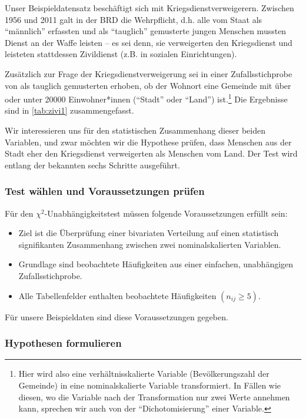 \documentclass[
  ngerman,
]{article}
\providecommand{\tightlist}{%
  \setlength{\itemsep}{0pt}\setlength{\parskip}{0pt}}
\begin{document}
Unser Beispieldatensatz beschäftigt sich mit Kriegsdienstverweigerern. Zwischen 1956 und 2011 galt in der BRD die Wehrpflicht, d.h. alle vom Staat als ``männlich'' erfassten und als ``tauglich'' gemusterte jungen Menschen mussten Dienst an der Waffe leisten -- es sei denn, sie verweigerten den Kriegsdienst und leisteten stattdessen Zivildienst (z.B. in sozialen Einrichtungen).

Zusätzlich zur Frage der Kriegsdienstverweigerung sei in einer Zufallsstichprobe von als tauglich gemusterten erhoben, ob der Wohnort eine Gemeinde mit über oder unter 20000 Einwohner*innen (``Stadt'' oder ``Land'') ist.\footnote{Hier wird also eine verhältnisskalierte Variable (Bevölkerungszahl der Gemeinde) in eine nominalskalierte Variable transformiert. In Fällen wie diesen, wo die Variable nach der Transformation nur zwei Werte annehmen kann, sprechen wir auch von der ``Dichotomisierung'' einer Variable.} Die Ergebnisse sind in \autoref{tab:zivi1} zusammengefasst.

Wir interessieren uns für den statistischen Zusammenhang dieser beiden Variablen, und zwar möchten wir die Hypothese prüfen, dass Menschen aus der Stadt eher den Kriegsdienst verweigerten als Menschen vom Land. Der Test wird entlang der bekannten sechs Schritte ausgeführt.

\hypertarget{test-wuxe4hlen-und-voraussetzungen-pruxfcfen-4}{%
\subsubsection{Test wählen und Voraussetzungen prüfen}\label{test-wuxe4hlen-und-voraussetzungen-pruxfcfen-4}}

Für den \(\chi^2\)-Unabhängigkeitstest müssen folgende Voraussetzungen erfüllt sein:

\begin{itemize}
\tightlist
\item
  Ziel ist die Überprüfung einer bivariaten Verteilung auf einen statistisch signifikanten Zusammenhang zwischen zwei nominalskalierten Variablen.
\item
  Grundlage sind beobachtete Häufigkeiten aus einer einfachen, unabhängigen Zufallsstichprobe.
\item
  Alle Tabellenfelder enthalten beobachtete Häufigkeiten \((n_{ij}\geq 5)\).
\end{itemize}

Für unsere Beispieldaten sind diese Voraussetzungen gegeben.

\hypertarget{hypothesen-formulieren-4}{%
\subsubsection{Hypothesen formulieren}\label{hypothesen-formulieren-4}}
\end{document}
